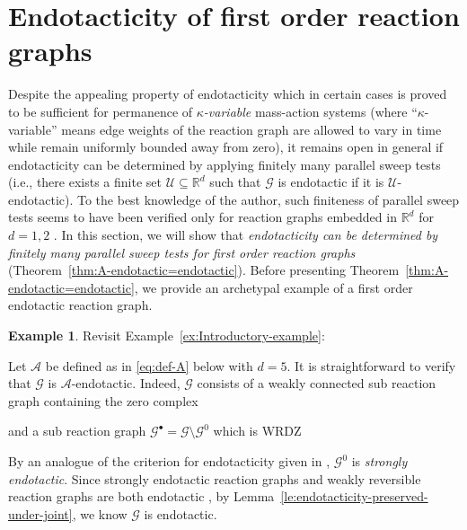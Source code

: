 \documentclass[10pt]{amsart}
\numberwithin{equation}{section}
\theoremstyle{plain}
\theoremstyle{definition}
\newtheorem{example}[theorem]{Example}
\theoremstyle{remark}
\newcommand{\cA}{\mathcal{A}}
\newcommand{\cG}{\mathcal{G}}
\newcommand{\cU}{\mathcal{U}}
\begin{document}
\section{Endotacticity of first order reaction graphs}\label{sect:endotacticity-first-order}

Despite the appealing property of endotacticity \cite{P12,CNP13,GMS14} which in certain cases is proved to be sufficient for permanence of \emph{$\kappa$-variable} mass-action systems (where ``$\kappa$-variable'' means edge weights of the reaction graph are allowed to vary in time while remain uniformly bounded away from zero), it remains open in general if endotacticity can be determined by applying finitely many parallel sweep tests 
(i.e., there exists a finite set $\mathcal{U}\subseteq\mathbb{R}^d$ such that $\cG$ is endotactic if it is $\cU$-endotactic). To the best knowledge of the author, such finiteness of parallel sweep tests seems to have been verified only for  reaction graphs embedded in $\mathbb{R}^d$ for $d=1,2$ \cite[Proposition~4.1]{CNP13}. 
In this section, we will show that \emph{endotacticity can be determined by finitely many parallel sweep tests for first order reaction graphs}  (Theorem~\ref{thm:A-endotactic=endotactic}). 
Before presenting Theorem~\ref{thm:A-endotactic=endotactic}, we provide an archetypal example of a first order endotactic reaction graph.
\begin{example}\label{ex:typical-endotactic}
Revisit Example~\ref{ex:Introductory-example}:
\begin{center}
\end{center}
Let $\cA$ be defined as in \eqref{eq:def-A} below with $d=5$. It is straightforward to verify that $\cG$ is $\cA$-endotactic. Indeed, $\cG$ consists of a weakly connected sub reaction graph containing the zero complex \begin{center}
\end{center}
and a sub reaction graph $\cG^{\bullet}=\cG\setminus\cG^0$ which is WRDZ
\begin{center}
\end{center}
By an analogue of the criterion for endotacticity given in \cite[Proposition~4.1]{CNP13}, $\cG^0$ is \emph{strongly endotactic}. Since strongly endotactic reaction graphs and weakly reversible reaction graphs are both endotactic \cite{CNP13}, by Lemma~\ref{le:endotacticity-preserved-under-joint}, we know $\cG$ is endotactic. 
\end{example}
\end{document}
